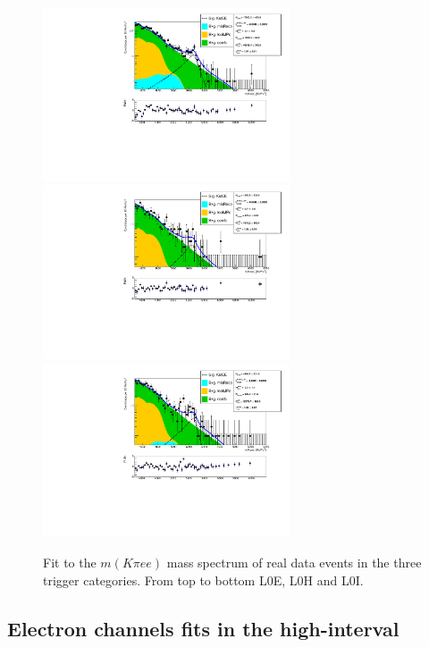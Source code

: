 %
\begin{figure}[h!]
\centering
\includegraphics[width=0.65\textwidth]{RKst/figs/fit_EEs_0_EE-q2central-gmc/KstEE_L0E_log_fitAndRes.pdf}
\includegraphics[width=0.65\textwidth]{RKst/figs/fit_EEs_0_EE-q2central-gmc/KstEE_L0H_log_fitAndRes.pdf}
\includegraphics[width=0.65\textwidth]{RKst/figs/fit_EEs_0_EE-q2central-gmc/KstEE_L0I_log_fitAndRes.pdf}
\caption{Fit to the $m(K\pi ee)$ mass spectrum of \BdKstee real data events in the three trigger categories.
From top to bottom L0E, L0H and L0I.
}
\label{fig:FitEE_Data_inTrigCat}
\end{figure}


\subsection{Electron channels fits in the high-\qsq interval}

